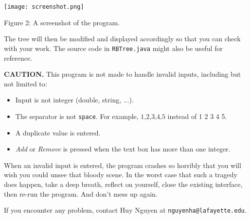 \documentclass[12pt]{article}
\begin{document}
\begin{center}
	\texttt{[image: screenshot.png]}

	Figure 2: A screenshot of the program.
\end{center}

The tree will then be modified and displayed accordingly so that you can check with your work. The source code in \texttt{RBTree.java} might also be useful for reference.

{\bf CAUTION.} This program is not made to handle invalid inputs, including but not limited to:
\begin{itemize}
	\item Input is not integer (double, string, ...).
	\item The separator is not \texttt{space}. For example, $\text{1,2,3,4,5}$ instead of 1 2 3 4 5.
	\item A duplicate value is entered.
	\item {\it Add} or {\it Remove} is pressed when the text box has more than one integer.
\end{itemize}

When an invalid input is entered, the program crashes so horribly that you will wish you could unsee that bloody scene. In the worst case that such a tragedy does happen, take a deep breath, reflect on yourself, close the existing interface, then re-run the program. And don't mess up again.

If you encounter any problem, contact Huy Nguyen at \texttt{nguyenha@lafayette.edu}.
\end{document}
